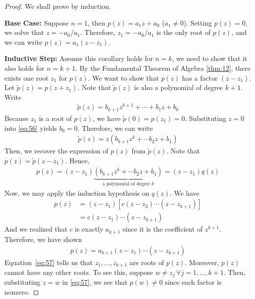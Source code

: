 \documentclass[thmcnt=section, color=cyan, 12pt]{my-elegantbook}
\begin{document}
\begin{proof}
    We shall prove by induction.

    \noindent\textbf{Base Case:} Suppose $n = 1$, then $p(z) = a_1 z + a_0$ ($a_1 \neq 0$). Setting $p(z) = 0$, we solve that $z = -a_0 / a_1$. Therefore, $z_1 = -a_0 / a_1$ is the only root of $p(z)$, and we can write $p(z) = a_1(z - z_1)$.

    \noindent\textbf{Inductive Step:} Assume this corollary holds for $n = k$, we need to show that it also holds for $n = k + 1$.
    By the Fundamental Theorem of Algebra \ref{thm:12}, there exists one root $z_1$ for $p(z)$.
    We want to show that $p(z)$ has a factor $(z - z_1)$.
    Let $\tilde{p}(z) = p(z + z_1)$.
    Note that $\tilde{p}(z)$ is also a polynomial of degree $k + 1$.
    Write
    \begin{align}
        \tilde{p}(z) = b_{k+1} z^{k+1} + \cdots + b_1 z + b_0
        \label{eq:56}
    \end{align}
    Because $z_1$ is a root of $p(z)$, we have $\tilde{p}(0) = p(z_1) = 0$. Substituting $z=0$ into \eqref{eq:56} yields $b_0 = 0$.
    Therefore, we can write
    \begin{align*}
        \tilde{p}(z) = z (b_{k+1} z^{k} + \cdots b_2 z + b_1)
    \end{align*}
    Then, we recover the expression of $p(z)$ from $\tilde{p}(z)$.
    Note that $p(z) = \tilde{p}(z - z_1)$.
    Hence,
    \begin{align*}
        p(z) = (z - z_1) \underbrace{(b_{k+1} z^{k} + \cdots b_2 z + b_1)}_{\text{a polynomial of degree $k$}}
        = (z - z_1) q(z)
    \end{align*}
    Now, we may apply the induction hypothesis on $q(z)$.
    We have
    \begin{align*}
        p(z) & = (z - z_1) [c (z - z_2) \cdots (z - z_{k+1})] \\
             & = c (z - z_1) \cdots (z - z_{k+1})
    \end{align*}
    And we realized that $c$ is exactly $a_{k+1}$ since it is the coefficient of $z^{k+1}$.
    Therefore, we have shown
    \begin{align}
        p(z) = a_{k+1} (z - z_1) \cdots (z - z_{k+1})
        \label{eq:57}
    \end{align}
    Equation~\eqref{eq:57} tells us that $z_1, \ldots, z_{k+1}$ are roots of $p(z)$.
    Moreover, $p(z)$ cannot have any other roots. To see this, suppose $w \neq z_j \ \forall j=1, \ldots, k+1$. Then, substituting $z = w$ in \eqref{eq:57}, we see that $p(w) \neq 0$ since each factor is nonzero.
\end{proof}
\end{document}
